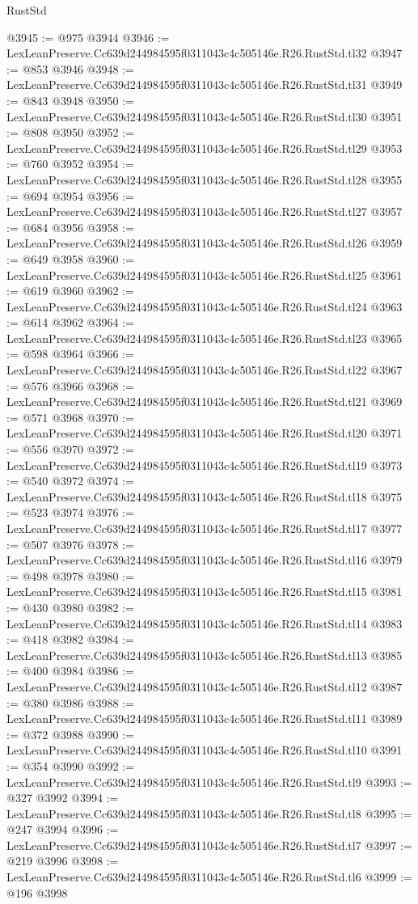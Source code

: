 \begin{lexlean}{RustStd}
\begin{coremodule}
@3945 := @975 @3944
@3946 := LexLeanPreserve.Cc639d244984595f0311043c4c505146e.R26.RustStd.tl32
@3947 := @853 @3946
@3948 := LexLeanPreserve.Cc639d244984595f0311043c4c505146e.R26.RustStd.tl31
@3949 := @843 @3948
@3950 := LexLeanPreserve.Cc639d244984595f0311043c4c505146e.R26.RustStd.tl30
@3951 := @808 @3950
@3952 := LexLeanPreserve.Cc639d244984595f0311043c4c505146e.R26.RustStd.tl29
@3953 := @760 @3952
@3954 := LexLeanPreserve.Cc639d244984595f0311043c4c505146e.R26.RustStd.tl28
@3955 := @694 @3954
@3956 := LexLeanPreserve.Cc639d244984595f0311043c4c505146e.R26.RustStd.tl27
@3957 := @684 @3956
@3958 := LexLeanPreserve.Cc639d244984595f0311043c4c505146e.R26.RustStd.tl26
@3959 := @649 @3958
@3960 := LexLeanPreserve.Cc639d244984595f0311043c4c505146e.R26.RustStd.tl25
@3961 := @619 @3960
@3962 := LexLeanPreserve.Cc639d244984595f0311043c4c505146e.R26.RustStd.tl24
@3963 := @614 @3962
@3964 := LexLeanPreserve.Cc639d244984595f0311043c4c505146e.R26.RustStd.tl23
@3965 := @598 @3964
@3966 := LexLeanPreserve.Cc639d244984595f0311043c4c505146e.R26.RustStd.tl22
@3967 := @576 @3966
@3968 := LexLeanPreserve.Cc639d244984595f0311043c4c505146e.R26.RustStd.tl21
@3969 := @571 @3968
@3970 := LexLeanPreserve.Cc639d244984595f0311043c4c505146e.R26.RustStd.tl20
@3971 := @556 @3970
@3972 := LexLeanPreserve.Cc639d244984595f0311043c4c505146e.R26.RustStd.tl19
@3973 := @540 @3972
@3974 := LexLeanPreserve.Cc639d244984595f0311043c4c505146e.R26.RustStd.tl18
@3975 := @523 @3974
@3976 := LexLeanPreserve.Cc639d244984595f0311043c4c505146e.R26.RustStd.tl17
@3977 := @507 @3976
@3978 := LexLeanPreserve.Cc639d244984595f0311043c4c505146e.R26.RustStd.tl16
@3979 := @498 @3978
@3980 := LexLeanPreserve.Cc639d244984595f0311043c4c505146e.R26.RustStd.tl15
@3981 := @430 @3980
@3982 := LexLeanPreserve.Cc639d244984595f0311043c4c505146e.R26.RustStd.tl14
@3983 := @418 @3982
@3984 := LexLeanPreserve.Cc639d244984595f0311043c4c505146e.R26.RustStd.tl13
@3985 := @400 @3984
@3986 := LexLeanPreserve.Cc639d244984595f0311043c4c505146e.R26.RustStd.tl12
@3987 := @380 @3986
@3988 := LexLeanPreserve.Cc639d244984595f0311043c4c505146e.R26.RustStd.tl11
@3989 := @372 @3988
@3990 := LexLeanPreserve.Cc639d244984595f0311043c4c505146e.R26.RustStd.tl10
@3991 := @354 @3990
@3992 := LexLeanPreserve.Cc639d244984595f0311043c4c505146e.R26.RustStd.tl9
@3993 := @327 @3992
@3994 := LexLeanPreserve.Cc639d244984595f0311043c4c505146e.R26.RustStd.tl8
@3995 := @247 @3994
@3996 := LexLeanPreserve.Cc639d244984595f0311043c4c505146e.R26.RustStd.tl7
@3997 := @219 @3996
@3998 := LexLeanPreserve.Cc639d244984595f0311043c4c505146e.R26.RustStd.tl6
@3999 := @196 @3998

\end{coremodule}
\end{lexlean}
